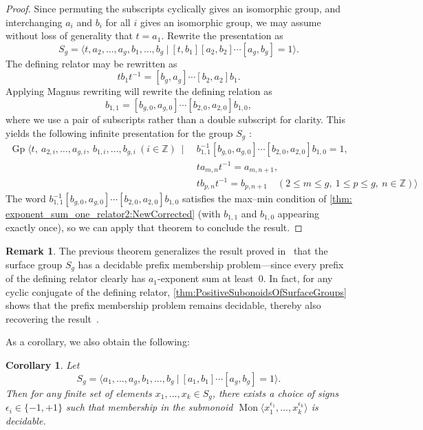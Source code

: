 \documentclass[11pt]{amsart}
\newcommand{\Mgen}[1]{\operatorname{Mon}\bigl\langle #1 \bigr\rangle}
\newcommand{\Gpres}[2]{\bigl\langle #1\:|\:#2 \bigr\rangle}
\theoremstyle{plain}
\newtheorem{cor}[theorem]{Corollary}
\theoremstyle{definition}
\newtheorem{remark}[theorem]{Remark}
\begin{document}
\begin{proof} 
Since permuting the subscripts cyclically gives an isomorphic group, and interchanging $a_i$ and $b_i$ for all $i$ gives an isomorphic group, we may assume without loss of generality that $t = a_1$. Rewrite the presentation as  
\[
S_g = \Gpres{t, a_2, \ldots, a_g, b_1, \ldots, b_g}{[t,b_1][a_2,b_2]\cdots[a_g,b_g] = 1}.
\]
The defining relator may be rewritten as 
\[
tb_1t^{-1} = [b_g,a_g]\cdots[b_2,a_2] b_1.
\]
Applying Magnus rewriting will rewrite the defining relation as 
\[
b_{1,1} = [b_{g,0},a_{g,0}]\cdots[b_{2,0},a_{2,0}] b_{1,0},
\]
where we use a pair of subscripts rather than a double subscript for clarity. This yields the following infinite presentation for the group $S_g$ :
\begin{align*}
\operatorname{Gp}\bigl\langle t,\ a_{2,i}, \ldots, a_{g,i},\ b_{1,i}, \ldots, b_{g,i}\ (i \in \mathbb{Z})\ \mid \ 
& b_{1,1}^{-1} [b_{g,0},a_{g,0}]\cdots[b_{2,0},a_{2,0}] b_{1,0} = 1, \\
& t a_{m,n} t^{-1} = a_{m,n+1}, \\
& t b_{p,n} t^{-1} = b_{p,n+1} \quad (2 \leq m \leq g,\ 1 \leq p \leq g,\ n \in \mathbb{Z}) 
\bigr\rangle
\end{align*}
The word $b_{1,1}^{-1} [b_{g,0},a_{g,0}]\cdots[b_{2,0},a_{2,0}] b_{1,0}$ satisfies the max–min condition of \cref{thm: exponent_sum_one_relator2:NewCorrected} (with $b_{1,1}$ and $b_{1,0}$ appearing exactly once), so we can apply that theorem to conclude the result.
\end{proof}

\begin{remark}
The previous theorem generalizes the result proved in~\cite{margolis2005distortion} that the surface group $S_g$ has a decidable prefix membership problem—since every prefix of the defining relator clearly has $a_1$-exponent sum at least~$0$. In fact, for any cyclic conjugate of the defining relator, \cref{thm:PositiveSubonoidsOfSurfaceGroups} shows that the prefix membership problem remains decidable, thereby also recovering the result~\cite[Theorem 5.10, Example 5.11]{dolinka2021new}.
\end{remark}

As a corollary, we also obtain the following:

\begin{cor}
Let 
\[
S_g = \Gpres{a_1, \ldots, a_g, b_1, \ldots, b_g}{[a_1,b_1] \cdots [a_g,b_g] = 1}.
\]
Then for any finite set of elements $x_1, \ldots, x_k \in S_g$, there exists a choice of signs $\epsilon_i \in \{-1,  +1\}$ such that membership in the submonoid $\Mgen{x_1^{\epsilon_1}, \ldots, x_k^{\epsilon_k}}$ is decidable.
\end{cor}
\end{document}
